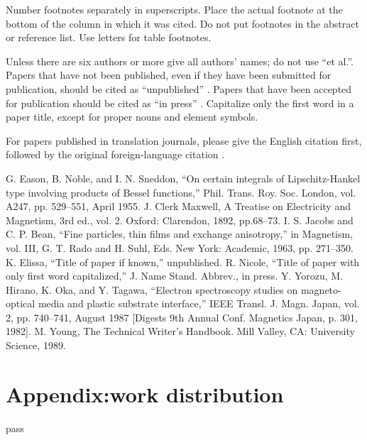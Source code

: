 \documentclass[conference]{IEEEtran}
\begin{document}
Number footnotes separately in superscripts. Place the actual footnote at 
the bottom of the column in which it was cited. Do not put footnotes in the 
abstract or reference list. Use letters for table footnotes.

Unless there are six authors or more give all authors' names; do not use 
``et al.''. Papers that have not been published, even if they have been 
submitted for publication, should be cited as ``unpublished'' \cite{b4}. Papers 
that have been accepted for publication should be cited as ``in press'' \cite{b5}. 
Capitalize only the first word in a paper title, except for proper nouns and 
element symbols.

For papers published in translation journals, please give the English 
citation first, followed by the original foreign-language citation \cite{b6}.

\begin{thebibliography}{00}
 G. Eason, B. Noble, and I. N. Sneddon, ``On certain integrals of Lipschitz-Hankel type involving products of Bessel functions,'' Phil. Trans. Roy. Soc. London, vol. A247, pp. 529--551, April 1955.
 J. Clerk Maxwell, A Treatise on Electricity and Magnetism, 3rd ed., vol. 2. Oxford: Clarendon, 1892, pp.68--73.
 I. S. Jacobs and C. P. Bean, ``Fine particles, thin films and exchange anisotropy,'' in Magnetism, vol. III, G. T. Rado and H. Suhl, Eds. New York: Academic, 1963, pp. 271--350.
 K. Elissa, ``Title of paper if known,'' unpublished.
 R. Nicole, ``Title of paper with only first word capitalized,'' J. Name Stand. Abbrev., in press.
 Y. Yorozu, M. Hirano, K. Oka, and Y. Tagawa, ``Electron spectroscopy studies on magneto-optical media and plastic substrate interface,'' IEEE Transl. J. Magn. Japan, vol. 2, pp. 740--741, August 1987 [Digests 9th Annual Conf. Magnetics Japan, p. 301, 1982].
 M. Young, The Technical Writer's Handbook. Mill Valley, CA: University Science, 1989.
\end{thebibliography}


\section{Appendix:work distribution}
pass
\end{document}
